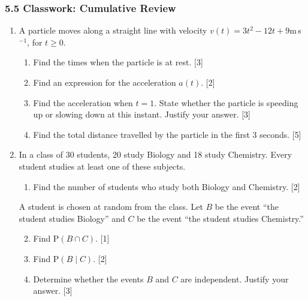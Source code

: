 \documentclass[12pt, twoside]{article}
\begin{document}
\subsubsection*{5.5 Classwork: Cumulative Review}

\begin{enumerate}[itemsep=0.15cm]

\item A particle moves along a straight line with velocity
      $v(t) = 3t^2 - 12t + 9$\;m\,s$^{-1}$, for $t \geq 0$.

\begin{enumerate}[itemsep=0.15cm]
  \item Find the times when the particle is at rest. \hfill [3]
  \item Find an expression for the acceleration $a(t)$. \hfill [2]
  \item Find the acceleration when $t = 1$. State whether the particle is
        speeding up or slowing down at this instant. Justify your answer. \hfill [3]
  \item Find the total distance travelled by the particle in the first
        3 seconds. \hfill [5]
\end{enumerate}


\newpage

\item In a class of 30 students, 20 study Biology and 18 study Chemistry.
      Every student studies at least one of these subjects.

\begin{enumerate}[itemsep=0.15cm]
  \item Find the number of students who study both Biology and Chemistry. \hfill [2]
\end{enumerate}

\medskip
A student is chosen at random from the class.
Let $B$ be the event ``the student studies Biology'' and
$C$ be the event ``the student studies Chemistry.''

\begin{enumerate}[itemsep=0.15cm]
  \setcounter{enumii}{1}
  \item Find $\mathrm{P}(B \cap C)$. \hfill [1]
  \item Find $\mathrm{P}(B \mid C)$. \hfill [2]
  \item Determine whether the events $B$ and $C$ are independent.
        Justify your answer. \hfill [3]
\end{enumerate}


\end{enumerate}
\end{document}
